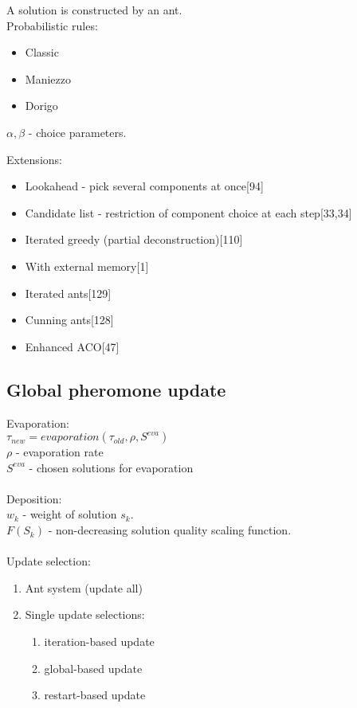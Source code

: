 \documentclass[12pt]{article}
\begin{document}
A solution is constructed by an ant. \\
Probabilistic rules: \\
\begin{itemize}
\item {Classic}
\item {Maniezzo}
\item {Dorigo}
\end{itemize}

$\alpha, \beta$ - choice parameters.

Extensions:
\begin{itemize}
\item {Lookahead - pick several components at once[94]}
\item {Candidate list - restriction of component choice at each step[33,34]}
\item {Iterated greedy (partial deconstruction)[110]}
\item {With external memory[1]}
\item {Iterated ants[129]}
\item {Cunning ants[128]}
\item {Enhanced ACO[47]}
\end{itemize}

\subsection{Global pheromone update}
Evaporation: \\
$\tau_{new}=evaporation(\tau_{old}, \rho, S^{eva})$ \\
$\rho$ - evaporation rate \\
$S^{eva}$ - chosen solutions for evaporation \\ \\

Deposition: \\
$w_k$ - weight of solution $s_k$. \\
$F(S_k)$ - non-decreasing solution quality scaling function. \\ \\

Update selection:
\begin{enumerate}
\item {Ant system (update all)}
\item {Single update selections:}
\begin{enumerate}
\item {iteration-based update}
\item {global-based update}
\item {restart-based update}
\end{enumerate}
\end{enumerate}
\end{document}
